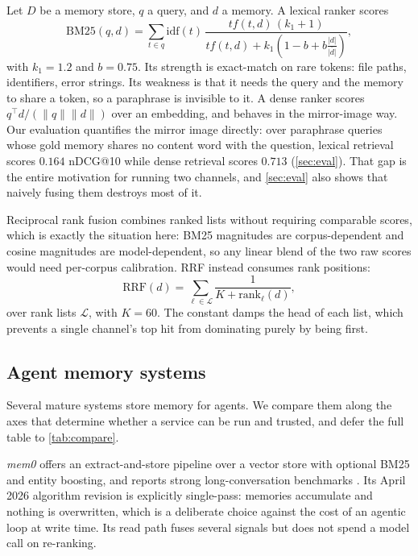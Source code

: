\documentclass[10pt,twocolumn]{article}
\begin{document}
Let $D$ be a memory store, $q$ a query, and $d$ a memory. A lexical ranker
scores
\begin{equation}
\mathrm{BM25}(q,d)=\sum_{t\in q}\mathrm{idf}(t)\,
  \frac{tf(t,d)\,(k_1{+}1)}{tf(t,d)+k_1\!\left(1-b+b\frac{|d|}{\bar{|d|}}\right)},
  \label{eq:bm25}
\end{equation}
with $k_1=1.2$ and $b=0.75$. Its strength is exact-match on rare tokens: file
paths, identifiers, error strings. Its weakness is that it needs the query and
the memory to share a token, so a paraphrase is invisible to it. A dense ranker
scores $q^\top d / (\lVert q\rVert \lVert d\rVert)$ over an embedding, and
behaves in the mirror-image way. Our evaluation quantifies the mirror image
directly: over paraphrase queries whose gold memory shares no content word with
the question, lexical retrieval scores $0.164$ nDCG@10 while dense retrieval
scores $0.713$ (\cref{sec:eval}). That gap is the entire motivation for running
two channels, and \cref{sec:eval} also shows that naively fusing them destroys
most of it.

Reciprocal rank fusion \citep{cormack2009rrf} combines ranked lists without
requiring comparable scores, which is exactly the situation here: BM25
magnitudes are corpus-dependent and cosine magnitudes are model-dependent, so
any linear blend of the two raw scores would need per-corpus calibration.
RRF instead consumes rank positions:
\begin{equation}
\mathrm{RRF}(d)=\sum_{\ell\in\mathcal{L}}\frac{1}{K+\mathrm{rank}_{\ell}(d)},
\label{eq:rrf}
\end{equation}
over rank lists $\mathcal{L}$, with $K=60$. The constant damps the head of each
list, which prevents a single channel's top hit from dominating purely by being
first.

\subsection{Agent memory systems}
\label{sec:related}

Several mature systems store memory for agents. We compare them along the
axes that determine whether a service can be run and trusted, and defer the
full table to \cref{tab:compare}.

\emph{mem0} offers an extract-and-store pipeline over a vector store with
optional BM25 and entity boosting, and reports strong long-conversation
benchmarks \citep{chhikara2025mem0}. Its April 2026 algorithm revision is
explicitly single-pass: memories accumulate and nothing is overwritten, which
is a deliberate choice against the cost of an agentic loop at write time. Its
read path fuses several signals but does not spend a model call on
re-ranking.
\end{document}
